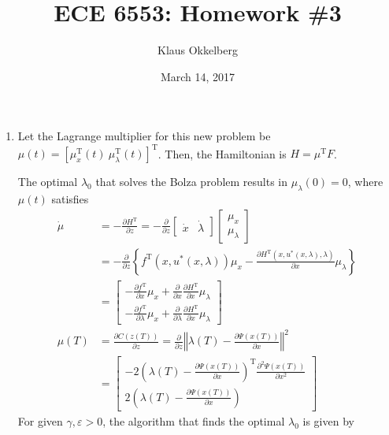 \documentclass[letterpaper,11pt,titlepage]{article}
\newcommand{\trans}{^\text{T}}
\newcommand*\pder[2]{\frac{\partial #1}{\partial #2}}
\begin{document}
\title{ECE 6553: Homework \#3}
\author{Klaus Okkelberg}
\date{March 14, 2017}
\maketitle


\begin{enumerate}[leftmargin=0pt]

\item Let the Lagrange multiplier for this new problem be $\mu(t)=[\mu_x\trans(t)\ \mu_\lambda\trans(t)]\trans$. Then, the Hamiltonian is $H = \mu\trans F$.

  The optimal $\lambda_0$ that solves the Bolza problem results in $\mu_\lambda(0)=0$, where $\mu(t)$ satisfies
  \begin{align}
    \dot\mu &= -\pder{H\trans}{z} = -\pder{}{z}
              \begin{bmatrix}
                \dot x & \dot\lambda
              \end{bmatrix} \begin{bmatrix}
                \mu_x \\ \mu_\lambda
              \end{bmatrix} \\
            &= -\pder{}{z} \left\{
              f\trans(x,u^*(x,\lambda))\mu_x - \pder{H\trans(x,u^*(x,\lambda),\lambda)}{x} \mu_\lambda
              \right\} \\
            &= \begin{bmatrix}
              \displaystyle -\pder{f\trans}{x}\mu_x + \pder{}{x} \pder{H\trans}{x} \mu_\lambda \\[2ex]
              \displaystyle -\pder{f\trans}{\lambda}\mu_x + \pder{}{\lambda} \pder{H\trans}{x}\mu_\lambda
            \end{bmatrix} \\
    \mu(T) &= \pder{C(z(T))}{z} = \pder{}{z} \left\Vert \lambda(T) - \pder{\Psi(x(T))}{x} \right\Vert^2 \\
            &= \begin{bmatrix}
              \displaystyle -2 \left(\lambda(T) - \pder{\Psi(x(T))}{x}\right)\trans \pder{^2 \Psi(x(T))}{x^2} \\[2ex]
              \displaystyle 2 \left(\lambda(T) - \pder{\Psi(x(T))}{x}\right)
            \end{bmatrix}
  \end{align}
  For given $\gamma,\varepsilon>0$, the algorithm that finds the optimal $\lambda_0$ is given by


\end{enumerate}
\end{document}
